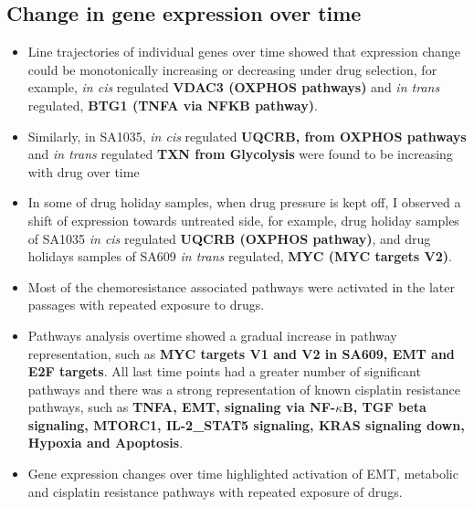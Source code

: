 \subsection{Change in gene expression over time}

\begin{itemize}
 
  \item Line trajectories of individual genes over time showed that expression change could be monotonically increasing or decreasing under drug selection, for example, \textit{in cis} regulated \textbf{VDAC3  (OXPHOS pathways)} and \textit{in trans} regulated, \textbf{BTG1 (TNFA via NFKB pathway)}. 
 
   \item Similarly, in SA1035, \textit{in cis} regulated \textbf{UQCRB, from OXPHOS pathways} and \textit{in trans} regulated \textbf{TXN from Glycolysis} were found to be increasing with drug over time
 
 \item In some of drug holiday samples, when drug pressure is kept off, I observed a shift of expression towards untreated side, for example, drug holiday samples of SA1035 \textit{in cis} regulated \textbf{UQCRB (OXPHOS pathway)}, and drug holidays samples of SA609 \textit{in trans} regulated, \textbf{MYC (MYC targets V2)}.

 
 \item Most of the chemoresistance associated pathways were activated in the later passages with repeated exposure to drugs.
 


 \item Pathways analysis overtime showed a gradual increase in pathway representation, such as \textbf{MYC targets V1 and V2 in SA609, EMT and E2F targets}. All last time points had a greater number of significant pathways and there was a strong representation of known cisplatin resistance pathways, such as \textbf{TNFA, EMT, signaling via NF-$\kappa$B, TGF  beta  signaling, MTORC1, IL-2\_STAT5 signaling, KRAS signaling down, Hypoxia and Apoptosis}. 

 \item Gene expression changes over time highlighted activation of EMT, metabolic and cisplatin resistance pathways with repeated exposure of drugs.



\end{itemize}
